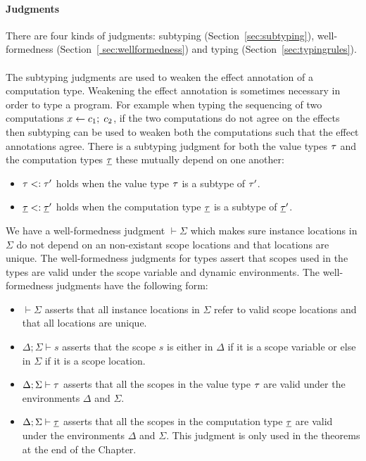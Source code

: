 {\paragraph{Judgments}
There are four kinds of judgments: subtyping (Section~\ref{sec:subtyping}), well-formedness (Section~\ref{
sec:wellformedness}) and typing (Section~\ref{sec:typingrules}).
\\\\
The subtyping judgments are used to weaken the effect annotation of a computation type.
Weakening the effect annotation is sometimes necessary in order to type a program.
For example when typing the sequencing of two computations $x \leftarrow c_1 ;\; c_2$, if the two computations do not agree on the effects then subtyping can be used to weaken both the computations such that the effect annotations agree.
There is a subtyping judgment for both the value types $\tau$ and the computation types $\underline{\tau}$ these mutually depend on one another:
\begin{itemize}
\setlength\itemsep{0.5em}
\item $\tau <: \tau'$ holds when the value type $\tau$ is a subtype of $\tau'$.
\item $\underline{\tau} <: \underline{\tau}'$ holds when the computation type $\underline{\tau}$ is a subtype of $\underline{\tau}'$.
\end{itemize}

We have a well-formedness judgment $\vdash \Sigma$ which makes sure instance locations in $\Sigma$ do not depend on an non-existant scope locations and that locations are unique.
The well-formedness judgments for types assert that scopes used in the types are valid under the scope variable and dynamic environments.
The well-formedness judgments have the following form:
\begin{itemize}
\setlength\itemsep{0.5em}
\item $\vdash \Sigma$ asserts that all instance locations in $\Sigma$ refer to valid scope locations and that all locations are unique.
\item $\Delta;\Sigma \vdash s$ asserts that the scope $s$ is either in $\Delta$ if it is a scope variable or else in $\Sigma$ if it is a scope location.
\item $\Delta;\Sigma \vdash \tau$ asserts that all the scopes in the value type $\tau$ are valid under the environments $\Delta$ and $\Sigma$.
\item $\Delta;\Sigma \vdash \underline{\tau}$ asserts that all the scopes in the computation type $\underline{\tau}$ are valid under the environments $\Delta$ and $\Sigma$. This judgment is only used in the theorems at the end of the Chapter.
\end{itemize}

}
